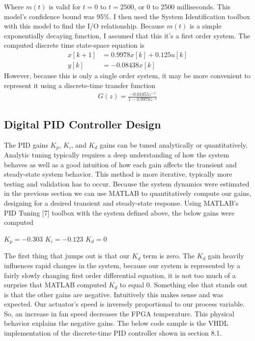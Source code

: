 \documentclass{article}
\begin{document}
Where $m(t)$ is valid for $t=0$ to $t=2500$, or 0 to 2500 milliseconds.
This model's confidence bound was 95\%. I then used the System Identification toolbox with this model to find the I/O relationship. Because $m(t)$ is a simple exponentially decaying function, I assumed that this it's a first order system. The computed discrete time state-space equation is
\begin{align*}
x[k+1] &= 0.9978x[k]+0.125u[k]\\
y[k] &= -0.08438x[k]
\end{align*}
However, because this is only a single order system, it may be more convenient to represent it using a discrete-time transfer function
\begin{align*}
  G(z)=\frac{-0.01055z^{-1}}{1-0.9978z^{-1}}
\end{align*}
\subsection{Digital PID Controller Design}
The PID gains $K_p$, $K_i$, and $K_d$ gains can be tuned analytically or quantitatively. Analytic tuning typically requires a deep understanding of how the system behaves as well as a good intuition of how each gain affects the transient and steady-state system behavior. This method is more iterative, typically more testing and validation has to occur. Because the system dynamics were estimated in the previous section we can use MATLAB to quantitatively compute our gains, designing for a desired transient and steady-state response. Using MATLAB's PID Tuning [7] toolbox with the system defined above, the below gains were computed
\begin{center}
$K_p=-0.303$	$K_i=-0.123$	$K_d=0$
\end{center}
The first thing that jumps out is that our $K_d$ term is zero. The $K_d$ gain heavily influences rapid changes in the system, because our system is represented by a fairly slowly changing first order differential equation, it is not too much of a surprise that MATLAB computed $K_d$ to equal 0. Something else that stands out is that the other gains are negative. Intuitively this makes sense and was expected. Our actuator's speed is inversely proportional to our process variable. So, an increase in fan speed decreases the FPGA temperature. This physical behavior explains the negative gains.
The below code sample is the VHDL implementation of the discrete-time PID controller shown in section 8.1.
\end{document}

